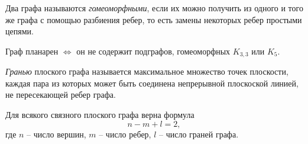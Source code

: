 \begin{definition}
    Два графа называются \emph{гомеоморфными}, если их можно получить из одного и того же графа с помощью разбиения ребер, то есть замены некоторых ребер простыми цепями.
\end{definition}

\begin{theorem}
    Граф планарен $ \iff $ он не содержит подграфов, гомеоморфных $ K_{3,3} $ или $ K_5 $.
\end{theorem}

\begin{definition}[Грань]
    \emph{Гранью} плоского графа называется максимальное множество точек плоскости, каждая пара из которых может быть соединена непрерывной плоскоской линией, не пересекающей ребер графа.
\end{definition}

\begin{theorem}
    Для всякого связного плоского графа верна формула
    \begin{equation}\label{eq:2}
        n-m+l=2,
    \end{equation}
    где $ n $ -- число вершин, $ m $ -- число ребер, $ l $ -- число граней графа.
\end{theorem}